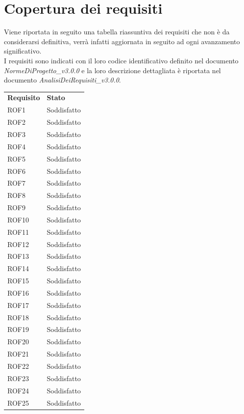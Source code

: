 \newpage
\section{Copertura dei requisiti}
Viene riportata in seguito una tabella riassuntiva dei requisiti che non è da considerarsi definitiva, verrà infatti aggiornata in seguito ad ogni avanzamento significativo. \\
I requisiti sono indicati con il loro codice identificativo definito nel documento \textit{NormeDiProgetto\_v3.0.0} e la loro descrizione dettagliata è riportata nel documento \textit{AnalisiDeiRequisiti\_v3.0.0}.
\begin{longtable}{| p{2.5cm} | p{3cm} |}
	\rowcolor{LightBlue}
	\color{white}\bfseries Requisito & \color{white}\bfseries Stato \\
	ROF1 & Soddisfatto \\ \hline
	ROF2 & Soddisfatto \\ \hline
	ROF3 & Soddisfatto \\ \hline
	ROF4 & Soddisfatto \\ \hline
	ROF5 & Soddisfatto \\ \hline
	ROF6 & Soddisfatto \\ \hline
	ROF7 & Soddisfatto \\ \hline
	ROF8 & Soddisfatto \\ \hline
	ROF9 & Soddisfatto \\ \hline
	ROF10 & Soddisfatto \\ \hline
	ROF11 & Soddisfatto \\ \hline
	ROF12 & Soddisfatto \\ \hline
	ROF13 & Soddisfatto \\ \hline
	ROF14 & Soddisfatto \\ \hline
	ROF15 & Soddisfatto \\ \hline
	ROF16 & Soddisfatto \\ \hline
	ROF17 & Soddisfatto \\ \hline
	ROF18 & Soddisfatto \\ \hline
	ROF19 & Soddisfatto \\ \hline
	ROF20 & Soddisfatto \\ \hline
	ROF21 & Soddisfatto \\ \hline
	ROF22 & Soddisfatto \\ \hline
	ROF23 & Soddisfatto \\ \hline
	ROF24 & Soddisfatto \\ \hline
	ROF25 & Soddisfatto \\ \hline

\end{longtable}
